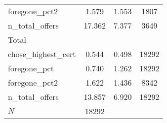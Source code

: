 \begin{table}[htbp]
\begin{tabular}{l*{1}{ccc}}
foregone\_pct2&       1.579&       1.553&        1807\\
n\_total\_offers&      17.362&       7.377&        3649\\
\hline
Total       &            &            &            \\
chose\_highest\_cert&       0.544&       0.498&       18292\\
foregone\_pct&       0.740&       1.262&       18292\\
foregone\_pct2&       1.622&       1.436&        8342\\
n\_total\_offers&      13.857&       6.920&       18292\\
\hline
\(N\)       &       18292&            &            \\
\hline\hline
\end{tabular}
\end{table}
